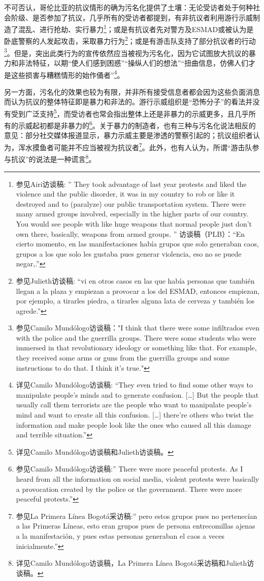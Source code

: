 \documentclass{phyasgn}\usepackage{nag}
\begin{document}
\par 不可否认，哥伦比亚的抗议情形的确为污名化提供了土壤：无论受访者处于何种社会阶级、是否参加了抗议，几乎所有的受访者都提到，有非抗议者利用游行示威制造了混乱、进行抢劫、实行暴力\footnote[41]{参见Airi访谈稿: ” They took advantage of last year protests and liked the violence and the public disorder, it was in my country to rob or like it destroyed and to (paralyze) our public transportation system. There were many armed groups involved, especially in the higher parts of our country. You would see people with like huge weapons that normal people just don't own there, basically, weapons from armed groups. ” 访谈稿（PLB）：“En cierto momento, en las manifestaciones había grupos que solo generaban caos, grupos a los que solo les gustaba pues generar violencia, eso no se puede negar,.”}；或是有抗议者先对警方及ESMAD或被认为是卧底警察的人发起攻击，采取暴力行为\footnote[42]{参见Julieth访谈稿: “vi en otros casos en las que había personas que también llegan a la plaza y empiezan a provocar a los del ESMAD, entonces empiezan, por ejemplo, a tirarles piedra, a tirarles alguna lata de cerveza y también los agrede.”}；或是有游击队支持了部分抗议者的行动\footnote[43]{参见Camilo Mundólogo访谈稿："I think that there were some infiltrados even with the police and the guerrilla groups. There were some students who were immersed in that revolutionary ideology or something like that. For example, they received some arms or guns from the guerrilla groups and some instructions to do that. I think it’s true."}。但是，突出此类行为的宣传依然应当被视为污名化，因为它试图放大抗议的暴力和非法特征，以期“使人们感到困惑”“操纵人们的想法”“扭曲信息，仿佛人们才是这些损害与糟糕情形的始作俑者”\footnote[44]{详见Camilo Mundólogo访谈稿: “They even tried to find some other ways to manipulate people’s minds and to generate confusion. […] But the people that usually call them terrorists are the people who want to manipulate people’s mind and want to create all this confusion. […] there’re others who twist the information and make people look like the ones who caused all this damage and terrible situation.”}。
\par 另一方面，污名化的效果也较为有限，并非所有接受信息者都会因为这些负面消息而认为抗议的整体特征即是暴力和非法的。游行示威组织是“恐怖分子”的看法并没有受到广泛支持\footnote[45]{详见Camilo Mundólogo访谈稿和Julieth访谈稿。}，而受访者也常会指出整体上还是非暴力的示威更多，且几乎所有的示威起初都是非暴力的\footnote[46]{参见Camilo Mundólogo访谈稿:” There were more peaceful protests. As I heard from all the information on social media, violent protests were basically a provocation created by the police or the government. There were more peaceful protests.”}。关于暴力的制造者，也有三种与污名化说法相反的意见：部分社交媒体报道显示，暴力示威主要是渗透的警察引起的；抗议组织者认为，浑水摸鱼者可能并不应当被视为抗议者\footnote[47]{参见La Primera Línea Bogotá采访稿:” pero estos grupos pues no pertenecían a las Primeras Líneas, esto eran grupos pues de persona entrecomillas ajenas a la manifestación, y pues estas personas generaban el caos a veces inicialmente.”}。此外，也有人认为，所谓“游击队参与抗议”的说法是一种谎言\footnote[48]{详见Camilo Mundólogo访谈稿，La Primera Línea Bogotá采访稿和Julieth访谈稿。}。
\end{document}

